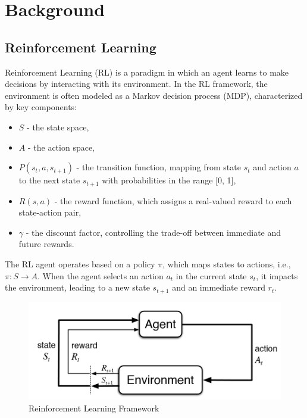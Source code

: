 \chapter{Background}
\section{Reinforcement Learning}

Reinforcement Learning (RL) is a paradigm in which an agent learns to make decisions by interacting with its environment. In the RL framework, the environment is often modeled as a Markov decision process (MDP), characterized by key components:

\begin{itemize}
  \item $S$ - the state space,
  \item $A$ - the action space,
  \item $P(s_t, a, s_{t+1})$ - the transition function, mapping from state $s_t$ and action $a$ to the next state $s_{t+1}$ with probabilities in the range [0, 1],
  \item $R(s, a)$ - the reward function, which assigns a real-valued reward to each state-action pair,
  \item $\gamma$ - the discount factor, controlling the trade-off between immediate and future rewards.
\end{itemize}

The RL agent operates based on a policy $\pi$, which maps states to actions, i.e., $\pi: S \rightarrow A$. When the agent selects an action $a_t$ in the current state $s_t$, it impacts the environment, leading to a new state $s_{t+1}$ and an immediate reward $r_t$.

\begin{figure}[htpb]
    \centering
    \includegraphics[scale=0.4]{images/background/RL.png}
    \centering
    \caption{Reinforcement Learning Framework}
    \label{fig:rl-framework}
\end{figure}

